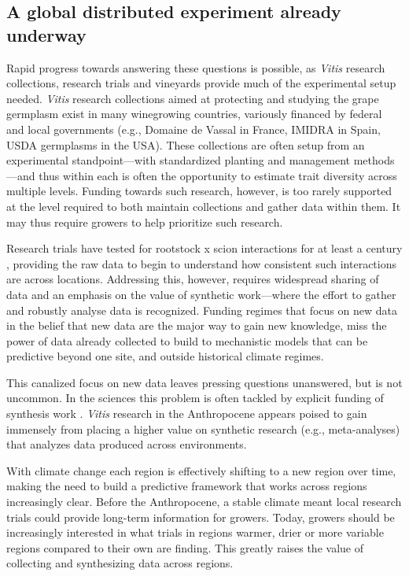 \documentclass[11pt]{article}
\begin{document}
\subsection{A global distributed experiment already underway}

Rapid progress towards answering these questions is possible, as \emph{Vitis} research collections, research trials and vineyards provide much of the experimental setup needed. \emph{Vitis} research collections aimed at protecting and studying the grape germplasm exist in many winegrowing countries, variously financed by federal and local governments (e.g., Domaine de Vassal in France, IMIDRA in Spain, USDA germplasms in the USA). These collections are often setup from an experimental standpoint---with standardized planting and management methods---and thus within each is often the opportunity to estimate trait diversity across multiple levels. Funding towards such research, however, is too rarely supported at the level required to both maintain collections and gather data within them. It may thus require growers to help prioritize such research. 

Research trials have tested for rootstock x scion interactions for at least a century \citep{hussman1930}, providing the raw data to begin to understand how consistent such interactions are across locations. Addressing this, however, requires widespread sharing of data and an emphasis on the value of synthetic work---where the effort to gather and robustly analyse data is recognized. Funding regimes that focus on new data in the belief that new data are the major way to gain new knowledge, miss the power of data already collected to build to mechanistic models that can be predictive beyond one site, and outside historical climate regimes. 

This canalized focus on new data leaves pressing questions unanswered, but is not uncommon. In the sciences this problem is often tackled by explicit funding of synthesis work \citep[e.g., many government and non-profit `think tanks' are designed explicitly to gather and learn from existing data,]{baron2017}. \emph{Vitis} research in the Anthropocene appears poised to gain immensely from placing a higher value on synthetic research (e.g., meta-analyses) that analyzes data produced across environments. %

With climate change each region is effectively shifting to a new region over time, making the need to build a predictive framework that works across regions increasingly clear. Before the Anthropocene, a stable climate meant local research trials could provide long-term information for growers. Today, growers should be increasingly interested in what trials in regions warmer, drier or more variable regions compared to their own are finding. This greatly raises the value of collecting and synthesizing data across regions.  
\end{document}
